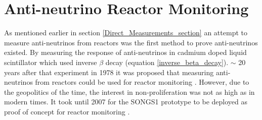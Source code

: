 
\section{Anti-neutrino Reactor Monitoring}
As mentioned earlier in section \ref{Direct_Measurements_section} an attempt to measure anti-neutrinos from reactors was the first method to prove anti-neutrinos existed. By measuring the response of anti-neutrinos in cadmium doped liquid scintillator \cite{Cowan1956Confirmation} which used inverse $\beta$ decay (equation \ref{inverse_beta_decay}). $\sim$ 20 years after that experiment in 1978 it was proposed that measuring anti-neutrinos from reactors could be used for reactor monitoring \cite{Borovoi_1978}. However, due to the geopolitics of the time, the interest in non-proliferation was not as high as in modern times. It took until 2007 for the SONGS1 prototype to be deployed as proof of concept for reactor monitoring \cite{Bowden_2007}. 
